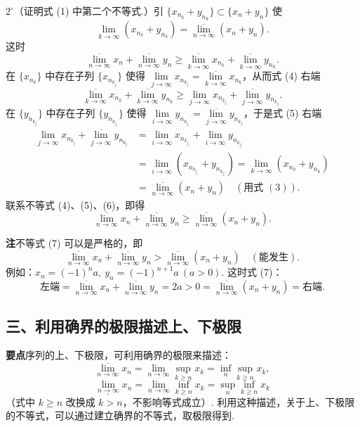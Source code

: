 \documentclass[UTF8, 12pt, fontset=fandol, oneside]{ctexart}
\begin{document}
$2^\circ$（证明式 (1) 中第二个不等式.）引 $\{x_{n_k}+y_{n_k}\}\subset\{x_n+y_n\}$ 使
\[
  \lim_{k\to\infty}(x_{n_k}+y_{n_k})=\overline{\lim_{n\to\infty}}(x_n+y_n).
\tag{3}
\]
这时
\[
  \overline{\lim_{n\to\infty}}x_n+\overline{\lim_{n\to\infty}}y_n
  \ge \overline{\lim_{k\to\infty}}x_{n_k}+\overline{\lim_{k\to\infty}}y_{n_k}.
\tag{4}
\]
在 $\{x_{n_k}\}$ 中存在子列 $\{x_{n_{k_j}}\}$ 使得 $\lim\limits_{j\to\infty}x_{n_{k_j}}=\overline{\lim\limits_{k\to\infty}}x_{n_k}$，从而式 (4) 右端
\[
  \overline{\lim_{k\to\infty}}x_{n_k}+\overline{\lim_{k\to\infty}}y_{n_k}
  \ge \lim_{j\to\infty}x_{n_{k_j}}+\overline{\lim_{j\to\infty}}y_{n_{k_j}}.
\tag{5}
\]
在 $\{y_{n_{k_j}}\}$ 中存在子列 $\{y_{n_{k_{j_i}}}\}$ 使得 $\lim\limits_{i\to\infty}y_{n_{k_{j_i}}}=\overline{\lim\limits_{j\to\infty}}y_{n_{k_j}}$，于是式 (5) 右端
\[
\begin{aligned}
  \lim_{j\to\infty}x_{n_{k_j}}+\overline{\lim_{j\to\infty}}y_{n_{k_j}}
  &=\lim_{i\to\infty}x_{n_{k_{j_i}}}+\lim_{i\to\infty}y_{n_{k_{j_i}}} \\
  &=\lim_{i\to\infty}(x_{n_{k_{j_i}}}+y_{n_{k_{j_i}}})
   =\lim_{k\to\infty}(x_{n_k}+y_{n_k}) \\
  &=\overline{\lim_{n\to\infty}}(x_n+y_n)\quad(\text{用式 }(3)).
\end{aligned}
\tag{6}
\]
联系不等式 (4)、(5)、(6)，即得
\[
  \overline{\lim_{n\to\infty}}x_n+\overline{\lim_{n\to\infty}}y_n
  \ge \overline{\lim_{n\to\infty}}(x_n+y_n).
\tag{7}
\]

\noindent\textbf{注}\quad 不等式 (7) 可以是严格的，即
\[
  \overline{\lim_{n\to\infty}}x_n+\overline{\lim_{n\to\infty}}y_n
  >\overline{\lim_{n\to\infty}}(x_n+y_n)\quad(\text{能发生}).
\]
例如：$x_n=(-1)^n a,\ y_n=(-1)^{n+1}a\ (a>0)$. 这时式 (7)：
\[
  \text{左端}=\overline{\lim_{n\to\infty}}x_n+\overline{\lim_{n\to\infty}}y_n=2a>0
  =\overline{\lim_{n\to\infty}}(x_n+y_n)=\text{右端}.
\]

\subsection*{三、利用确界的极限描述上、下极限}

\noindent\textbf{要点}\quad 序列的上、下极限，可利用确界的极限来描述：
\[
  \overline{\lim_{n\to\infty}}x_n=\lim_{n\to\infty}\sup_{k\ge n}x_k=\inf_n\sup_{k\ge n}x_k,
\]
\[
  \underline{\lim_{n\to\infty}}x_n=\lim_{n\to\infty}\inf_{k\ge n}x_k=\sup_n\inf_{k\ge n}x_k
\]
（式中 $k\ge n$ 改换成 $k>n$，不影响等式成立）. 利用这种描述，关于上、下极限的不等式，可以通过建立确界的不等式，取极限得到.
\end{document}
